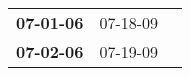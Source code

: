 \begin{supertabular}{p{0.33\columnwidth}p{0.33\columnwidth}p{0.33\columnwidth}}
 \textbf{07-01-06\textsuperscript{}} &  07-18-09\textsuperscript{} \\
 \textbf{07-02-06\textsuperscript{}} &  07-19-09\textsuperscript{} \\
\end{supertabular}
